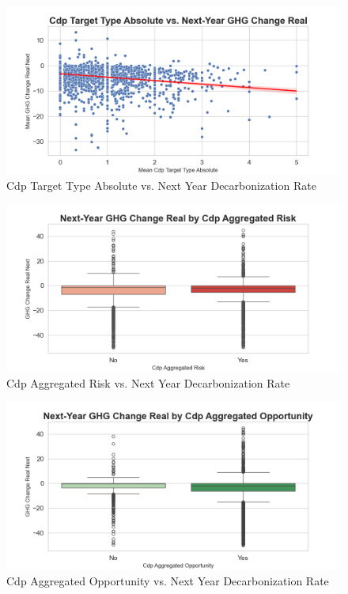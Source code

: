 \begin{figure}[H]
\centering
  \includegraphics[width=\textwidth]{figures/cdp_target_type_absolute_vs_ghg_change_real_next.png}
\caption{Cdp Target Type Absolute vs. Next Year Decarbonization Rate}
\label{fig:cdp_target_type_absolute_vs_ghg_change_real_next}
\end{figure}

\begin{figure}[H]
\centering
  \includegraphics[width=\textwidth]{figures/ghg_change_real_next_by_cdp_aggregated_risk.png}
\caption{Cdp Aggregated Risk vs. Next Year Decarbonization Rate}
\label{fig:ghg_change_real_next_by_cdp_aggregated_risk}
\end{figure}

\begin{figure}[H]
\centering
  \includegraphics[width=\textwidth]{figures/ghg_change_real_next_by_cdp_aggregated_opportunity.png}
\caption{Cdp Aggregated Opportunity vs. Next Year Decarbonization Rate}
\label{fig:ghg_change_real_next_by_cdp_aggregated_opportunity}
\end{figure}


